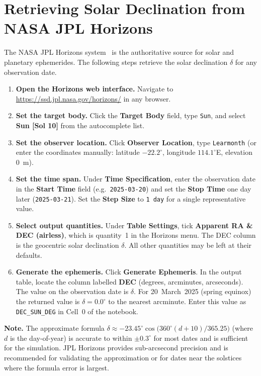 \section{Retrieving Solar Declination from NASA JPL Horizons}
\label{sec:appx-jpl}

The NASA JPL Horizons system~\citep{jpl_horizons} is the authoritative source
for solar and planetary ephemerides.  The following steps retrieve the solar
declination $\delta$ for any observation date.

\begin{enumerate}[leftmargin=1.8em, label=\textbf{Step \arabic*.}]
  \item \textbf{Open the Horizons web interface.}
        Navigate to \url{https://ssd.jpl.nasa.gov/horizons/} in any browser.

  \item \textbf{Set the target body.}
        Click the \textbf{Target Body} field, type \texttt{Sun}, and select
        \textbf{Sun [Sol 10]} from the autocomplete list.

  \item \textbf{Set the observer location.}
        Click \textbf{Observer Location}, type \texttt{Learmonth} (or enter
        the coordinates manually: latitude $-22.2^\circ$, longitude
        $114.1^\circ$E, elevation 0~m).

  \item \textbf{Set the time span.}
        Under \textbf{Time Specification}, enter the observation date in the
        \textbf{Start Time} field (e.g.\ \texttt{2025-03-20}) and set the
        \textbf{Stop Time} one day later (\texttt{2025-03-21}).  Set the
        \textbf{Step Size} to \texttt{1~day} for a single representative value.

  \item \textbf{Select output quantities.}
        Under \textbf{Table Settings}, tick \textbf{Apparent RA \& DEC
        (airless)}, which is quantity~1 in the Horizons menu.  The DEC
        column is the geocentric solar declination $\delta$.  All other
        quantities may be left at their defaults.

  \item \textbf{Generate the ephemeris.}
        Click \textbf{Generate Ephemeris}.  In the output table, locate the
        column labelled \textbf{DEC} (degrees, arcminutes, arcseconds).  The
        value on the observation date is $\delta$.  For 20~March~2025
        (spring equinox) the returned value is $\delta = 0.0^\circ$ to the
        nearest arcminute.  Enter this value as \texttt{DEC\_SUN\_DEG} in
        Cell~0 of the notebook.
\end{enumerate}

\noindent
\textbf{Note.}  The approximate formula
$\delta \approx -23.45^\circ\cos\!\bigl(360^\circ(d+10)/365.25\bigr)$
(where $d$ is the day-of-year) is accurate to within $\pm0.3^\circ$ for most
dates and is sufficient for the simulation.  JPL Horizons provides
sub-arcsecond precision and is recommended for validating the approximation
or for dates near the solstices where the formula error is largest.

